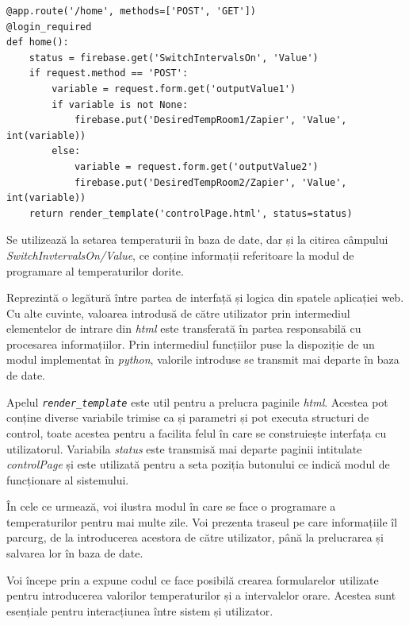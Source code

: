 \vspace{1em}
\begin{lstlisting}
@app.route('/home', methods=['POST', 'GET'])
@login_required
def home():
    status = firebase.get('SwitchIntervalsOn', 'Value')
    if request.method == 'POST':
        variable = request.form.get('outputValue1')
        if variable is not None:
            firebase.put('DesiredTempRoom1/Zapier', 'Value', int(variable))
        else:
            variable = request.form.get('outputValue2')
            firebase.put('DesiredTempRoom2/Zapier', 'Value', int(variable))
    return render_template('controlPage.html', status=status)
\end{lstlisting}
\vspace{2em} 


	 Se utilizează la setarea temperaturii în baza de date, dar și la citirea câmpului \textit{SwitchInvtervalsOn/Value}, ce conține informații referitoare la modul de programare al temperaturilor dorite. 

	Reprezintă o legătură între partea de interfață și logica din spatele aplicației web. Cu alte cuvinte, valoarea introdusă de către utilizator prin intermediul elementelor de intrare din \textit{html} este transferată în partea responsabilă cu procesarea informațiilor. Prin intermediul funcțiilor puse la dispoziție de un modul implementat în \textit{python}, valorile introduse se transmit mai departe în baza de date.

	Apelul \textit{\texttt{render\_template}} este util pentru a prelucra paginile \textit{html}. Acestea pot conține diverse variabile trimise ca și parametri și pot executa structuri de control, toate acestea pentru a facilita felul în care se construiește interfața cu utilizatorul. Variabila \textit{status} este transmisă mai departe paginii intitulate \textit{controlPage} și este utilizată pentru a seta poziția butonului ce indică modul de funcționare al sistemului.

\vspace{2em}

	În cele ce urmează, voi ilustra modul în care se face o programare a temperaturilor pentru mai multe zile. Voi prezenta traseul pe care informațiile îl parcurg, de la introducerea acestora de către utilizator, până la prelucrarea și salvarea lor în baza de date.

	Voi începe prin a expune codul ce face posibilă crearea formularelor utilizate pentru introducerea valorilor temperaturilor și a intervalelor orare. Acestea sunt esențiale pentru interacțiunea între sistem și utilizator.  

